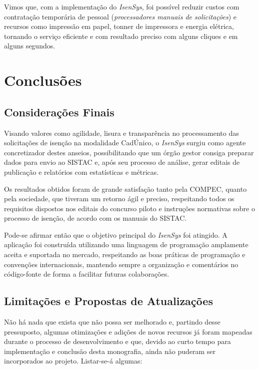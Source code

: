 \documentclass[
	12pt,			%
	openright,		%
	oneside,	
	a4paper,		%
	english,		%
	brazil			%
]{abntex2/abntex2}  %
\begin{document}
		Vimos que, com a implementação do \textit{IsenSys}, foi possível reduzir custos com contratação temporária de pessoal (\textit{processadores manuais de solicitações}) e recursos como impressão em papel, tonner de impressora e energia elétrica, tornando o serviço eficiente e com resultado preciso com alguns cliques e em alguns segundos.

	\chapter{Conclusões}
	
		\section{Considerações Finais}
	
			Visando valores como agilidade, lisura e transparência no processamento das solicitações de isenção na modalidade CadÚnico, o \textit{IsenSys} surgiu como agente concretizador destes anseios, possibilitando que um órgão gestor consiga preparar dados para envio ao SISTAC e, após seu processo de análise, gerar editais de publicação e relatórios com estatísticas e métricas.
			
			Os resultados obtidos foram de grande satisfação tanto pela COMPEC, quanto pela sociedade, que tiveram um retorno ágil e preciso, respeitando todos os requisitos dispostos nos editais do concurso piloto e instruções normativas sobre o processo de isenção, de acordo com os manuais do SISTAC.
			
			Pode-se afirmar então que o objetivo principal do \textit{IsenSys} foi atingido. A aplicação foi construída utilizando uma linguagem de programação amplamente aceita e suportada no mercado, respeitando as boas práticas de programação e convenções internacionais, mantendo sempre a organização e comentários no código-fonte de forma a facilitar futuras colaborações.
	
		\section{Limitações e Propostas de Atualizações}
		
			Não há nada que exista que não possa ser melhorado e, partindo desse pressuposto, algumas otimizações e adições de novos recursos já foram mapeadas durante o processo de desenvolvimento e que, devido ao curto tempo para implementação e conclusão desta monografia, ainda não puderam ser incorporados ao projeto. Listar-se-á algumas:
			
\end{document}
